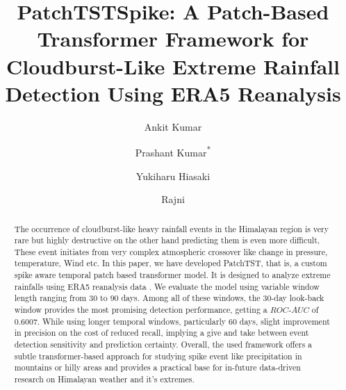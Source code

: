 \documentclass[runningheads]{llncs}
\begin{document}
\title{PatchTSTSpike: A Patch-Based Transformer Framework for Cloudburst-Like Extreme Rainfall Detection Using ERA5 Reanalysis}

\author{Ankit Kumar \and Prashant Kumar\textsuperscript{*} \and Yukiharu Hiasaki \and Rajni}








\maketitle

\begin{abstract}
The occurrence of cloudburst-like heavy rainfall events in the Himalayan region is very rare but highly destructive on the other hand predicting them is even more difficult, These event initiates from very complex atmospheric crossover like change in pressure, temperature, Wind etc. In this paper, we have developed PatchTST, that is, a custom spike aware temporal patch based transformer model. It is designed to analyze extreme rainfalls using ERA5 reanalysis data \cite{era5}. We evaluate the model using variable window length ranging from $30$ to $90$ days. Among all of these windows, the $30$-day look-back window provides the most promising detection performance, getting a $ROC$-$AUC$ of $0.6007$. While using longer temporal windows, particularly $60$ days, slight improvement in precision on the cost of reduced recall, implying a give and take between event detection sensitivity and prediction certainty. Overall, the used framework offers a subtle transformer-based approach for studying spike event like precipitation in mountains or hilly areas and provides a practical base for in-future data-driven research on Himalayan weather and it's extremes.
\end{abstract}
\end{document}

